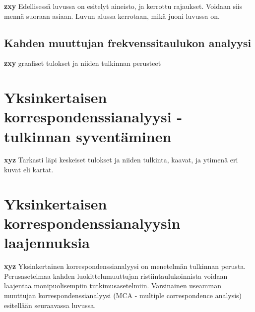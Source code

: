 \documentclass[finnish,]{book}
\begin{document}
\textbf{zxy} Edellisessä luvussa on esitelyt aineisto, ja kerrottu
rajaukset. Voidaan siis mennä suoraan asiaan. Luvun alussa kerrotaan,
mikä juoni luvussa on.

\hypertarget{kahden-muuttujan-frekvenssitaulukon-analyysi}{%
\section{Kahden muuttujan frekvenssitaulukon
analyysi}\label{kahden-muuttujan-frekvenssitaulukon-analyysi}}

\textbf{zxy} graafiset tulokset ja niiden tulkinnan perusteet

\hypertarget{yksinkertaisen-korrespondenssianalyysi---tulkinnan-syventaminen}{%
\chapter{Yksinkertaisen korrespondenssianalyysi - tulkinnan
syventäminen}\label{yksinkertaisen-korrespondenssianalyysi---tulkinnan-syventaminen}}

\textbf{xyz} Tarkasti läpi keskeiset tulokset ja niiden tulkinta,
kaavat, ja ytimenä eri kuvat eli kartat.

\hypertarget{yksinkertaisen-korrespondenssianalyysin-laajennuksia}{%
\chapter{Yksinkertaisen korrespondenssianalyysin
laajennuksia}\label{yksinkertaisen-korrespondenssianalyysin-laajennuksia}}

\textbf{xyz} Yksinkertainen korrespondenssianalyysi on menetelmän
tulkinnan perusta. Perusasetelmaa kahden luokittelumuuttujan
ristiintaulukoinnista voidaan laajentaa monipuolisempiin
tutkimusasetelmiin. Varsinainen useamman muuttujan
korrespondenssianalyysi (MCA - multiple correspondence analysis)
esitellään seuraavassa luvussa.


\end{document}
